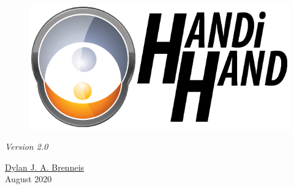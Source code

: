 \documentclass[
11pt, %
oneside, %
english, %
headsepline, %
chapterinoneline, %
openany, %
]{Manual} %
\author{Dylan J. A. \textsc{Brenneis}} %
\begin{document}
\frontmatter %

\pagestyle{plain} %


\begin{titlepage}

\begin{figure}
\includegraphics[width=0.7\linewidth]{Figures/Handi hand Logo.png}
\end{figure}

\begin{flushright}
\null
\vfill
{\Huge \bfseries \ttitle\par}\vspace{0.6cm} %
\Large{\textit{Version 2.0}}

\href{http://www.dylanbrenneis.ca}{Dylan J. A. Brenneis}\\%
August 2020
\end{flushright}
\end{titlepage}


\end{document}
